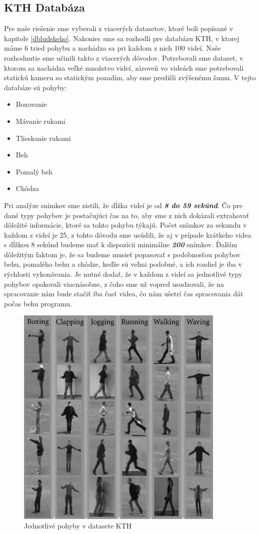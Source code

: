 \subsection{KTH Databáza}
Pre naše riešenie sme vyberali z viacerých datasetov, ktoré boli popísané v kapitole \ref{dbludskeho}. Nakoniec sme sa rozhodli pre databázu KTH, v ktorej máme 6 tried pohybu a nachádza sa pri každom z nich 100 videí. Naše rozhodnutie sme učinili takto z viacerých dôvodov. Potrebovali sme dataset, v ktorom sa nachádza veľké množstvo videí, zároveň vo videách sme potrebovali statickú kameru so statickým pozadím, aby sme predišli zvýšenému šumu. V tejto databáze sú pohyby:

\begin{itemize}
\item Boxovanie
\item Mávanie rukami
\item Tlieskanie rukami
\item Beh
\item Pomalý beh
\item Chôdza
\end{itemize}

Pri analýze snímkov sme zistili, že dĺžka videí je od \textit{\textbf{8 do 59 sekúnd}}. Čo pre dané typy pohybov je postačujúci čas na to, aby sme z nich dokázali extrahovať dôležité informácie, ktoré sa tohto pohybu týkajú.  Počet snímkov za sekundu v každom z videí je 25, z tohto dôvodu sme usúdili, že aj v prípade krátkeho videa s dĺžkou 8 sekúnd budeme mať k dispozícii minimálne \textit{\textbf{200}} snímkov. Ďalším dôležitým faktom je, že sa budeme musieť popasovať s podobnosťou pohybov behu, pomalého behu a chôdze, keďže sú veľmi podobné, a ich rozdiel je iba v rýchlosti vykonávania. Je nutné dodať, že v každom z videí sa jednotlivé typy pohybov opakovali viacnásobne, z čoho sme už vopred usudzovali, že na spracovanie nám bude stačiť iba časť videa, čo nám ušetrí čas spracovania dát počas behu programu. 

\begin{figure}[h]
  \centering
  \includegraphics[width=10cm]{img/KTHdataset.png}
  \caption{Jednotlivé pohyby v datasete KTH \cite{c14}}
  \label{KTHobr}
\end{figure}

